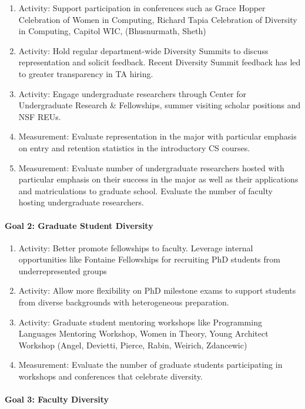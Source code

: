 \begin{enumerate}
\item Activity: Support participation in conferences such as Grace Hopper Celebration of Women in Computing, Richard Tapia Celebration of Diversity in Computing, Capitol WIC, (Bhusnurmath, Sheth)
\item Activity: Hold regular department-wide Diversity Summits to discuss representation and solicit feedback. Recent Diversity Summit feedback has led to greater transparency in TA hiring.
\item Activity: Engage undergraduate researchers through Center for Undergraduate Research \& Fellowships, summer visiting scholar positions and NSF REUs.
\item Measurement: Evaluate representation in the major with particular emphasis on entry and retention statistics in the introductory CS courses.
\item Measurement: Evaluate number of undergraduate researchers hosted with particular emphasis on their success in the major as well as their applications and matriculations to graduate school. Evaluate the number of faculty hosting undergraduate researchers.
\end{enumerate}

\paragraph*{Goal 2: Graduate Student Diversity}
\begin{enumerate}
\item Activity: Better promote fellowships to faculty. Leverage internal opportunities like Fontaine Fellowships for recruiting PhD students from underrepresented groups
\item Activity: Allow more flexibility on PhD milestone exams to support students from diverse backgrounds with heterogeneous preparation.
\item Activity: Graduate student mentoring workshops like Programming Languages Mentoring Workshop, Women in Theory, Young Architect Workshop (Angel, Devietti, Pierce, Rabin, Weirich, Zdancewic)
\item Measurement: Evaluate the number of graduate students participating in workshops and conferences that celebrate diversity.
\end{enumerate}

\paragraph*{Goal 3: Faculty Diversity}

